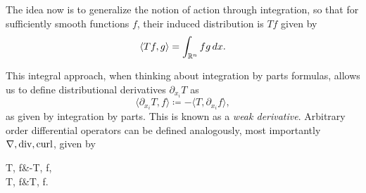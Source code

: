 The idea now is to generalize the notion of action through integration, so that for sufficiently smooth functions $f$, their induced distribution is $Tf$ given by
\begin{equation}\label{eq:action-distribution}
    \langle Tf, g \rangle = \int_{\mathbb{R}^n} fg\,dx.
\end{equation}

This integral approach, when thinking about integration by parts formulas, allows us to define distributional derivatives $\partial_{x_i} T$ as
\begin{equation}\label{eq:distributional-ibp}
    \langle \partial_{x_i} T, f\rangle \coloneqq -\langle T, \partial_{x_i} f\rangle,
\end{equation}
as given by integration by parts. This is known as a \emph{weak derivative}. Arbitrary order differential operators can be defined analogously, most importantly $\operatorname{\nabla}, \operatorname{\text{div}}, \operatorname{\text{curl}}$, given by 
\begin{tightalign}
    \langle \dive T, f\rangle &\coloneqq -\langle T, \grad f\rangle, \\
    \langle \curl T, f\rangle &\coloneqq \langle T, \curl f\rangle.
\end{tightalign}
